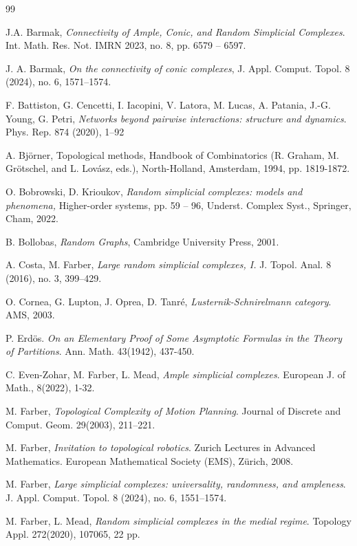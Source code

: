 \documentclass[11pt,twoside, reqno]{amsart}
\theoremstyle{plain}
\theoremstyle{definition}
\begin{document}
\begin{thebibliography}{99}


 J.A. Barmak, \textit{Connectivity of Ample, Conic, and Random Simplicial Complexes}. Int. Math. Res. Not. IMRN 2023, no. 8, pp. 6579 -- 6597.

 J. A. Barmak, \textit{On the connectivity of conic complexes},  J. Appl. Comput. Topol. 8 (2024), no. 6, 1571–1574.

 F. Battiston, G. Cencetti, I. Iacopini, V. Latora, M. Lucas, A. Patania, J.-G. Young, G. Petri, \textit{Networks beyond pairwise interactions: structure and dynamics}. Phys. Rep. 874 (2020), 1–92

 A. Bj\"orner, Topological methods, Handbook of Combinatorics (R. Graham, M. Grötschel, and L. Lovász, eds.), North-Holland, Amsterdam, 1994, pp. 1819-1872.

 O. Bobrowski, D. Krioukov, 
\textit{Random simplicial complexes: models and phenomena,} Higher-order systems, pp. 59 -- 96,
Underst. Complex Syst., Springer, Cham, 2022. 

 B. Bollobas, \textit{Random Graphs}, Cambridge University Press, 2001.

 A. Costa, M. Farber, 
\textit{Large random simplicial complexes, I.}
J. Topol. Anal. 8 (2016), no. 3, 399–429.

 O. Cornea, G. Lupton, J. Oprea, D. Tanr\'e, \textit{Lusternik-Schnirelmann category}. AMS, 2003.

 P. Erd\"os. \textit{On an Elementary Proof of Some Asymptotic Formulas in the Theory of Partitions}. Ann. Math. 43(1942), 437-450.

 C. Even-Zohar, M. Farber, L. Mead, \textit{Ample simplicial complexes}. European J. of Math., 8(2022), 1-32.

 M. Farber, \textit{Topological Complexity of Motion Planning}. Journal of Discrete and Comput. Geom. 29(2003), 211–221.

 M. Farber, \textit{Invitation to topological robotics}. Zurich Lectures in Advanced Mathematics. European Mathematical Society (EMS), Zürich, 2008.

 M. Farber, \textit{Large simplicial complexes: universality, randomness, and ampleness}. 
 J. Appl. Comput. Topol. 8 (2024), no. 6, 1551–1574.



 M. Farber, L. Mead, \textit{Random simplicial complexes in the medial regime}. Topology Appl. 272(2020), 107065, 22 pp.


\end{thebibliography}
\end{document}
